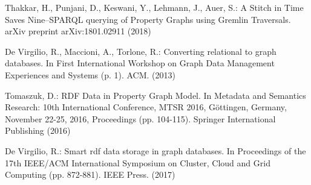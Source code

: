 \documentclass[runningheads]{llncs}
\begin{document}
\begin{thebibliography}{8}
Thakkar, H., Punjani, D., Keswani, Y., Lehmann, J., Auer, S.: A Stitch in Time Saves Nine--SPARQL querying of Property Graphs using Gremlin Traversals. arXiv preprint arXiv:1801.02911 (2018)

De Virgilio, R., Maccioni, A., Torlone, R.: Converting relational to graph databases. In First International Workshop on Graph Data Management Experiences and Systems (p. 1). ACM. (2013)

Tomaszuk, D.: RDF Data in Property Graph Model. In Metadata and Semantics Research: 10th International Conference, MTSR 2016, Göttingen, Germany, November 22-25, 2016, Proceedings (pp. 104-115). Springer International Publishing (2016)

De Virgilio, R.: Smart rdf data storage in graph databases. In Proceedings of the 17th IEEE/ACM International Symposium on Cluster, Cloud and Grid Computing (pp. 872-881). IEEE Press. (2017)





\end{thebibliography}
\end{document}
